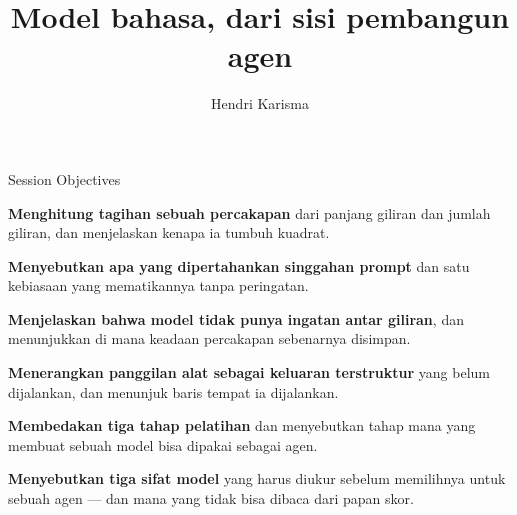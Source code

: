 \documentclass[aspectratio=169,11pt,t]{beamer}
\title{Model bahasa, dari sisi pembangun agen}
\author{Hendri Karisma}
\date{}
\begin{document}
\covertitle

\begin{frame}[shrink=25]{Session Objectives}
\begin{isteps}
\item \textbf{Menghitung tagihan sebuah percakapan} dari panjang giliran dan jumlah giliran, dan menjelaskan kenapa ia tumbuh kuadrat.
\item \textbf{Menyebutkan apa yang dipertahankan singgahan prompt} dan satu kebiasaan yang mematikannya tanpa peringatan.
\item \textbf{Menjelaskan bahwa model tidak punya ingatan antar giliran}, dan menunjukkan di mana keadaan percakapan sebenarnya disimpan.
\item \textbf{Menerangkan panggilan alat sebagai keluaran terstruktur} yang belum dijalankan, dan menunjuk baris tempat ia dijalankan.
\item \textbf{Membedakan tiga tahap pelatihan} dan menyebutkan tahap mana yang membuat sebuah model bisa dipakai sebagai agen.
\item \textbf{Menyebutkan tiga sifat model} yang harus diukur sebelum memilihnya untuk sebuah agen --- dan mana yang tidak bisa dibaca dari papan skor.
\end{isteps}

\vskip 6pt
\vskip 4pt
\vskip 2pt
\end{frame}
\end{document}
